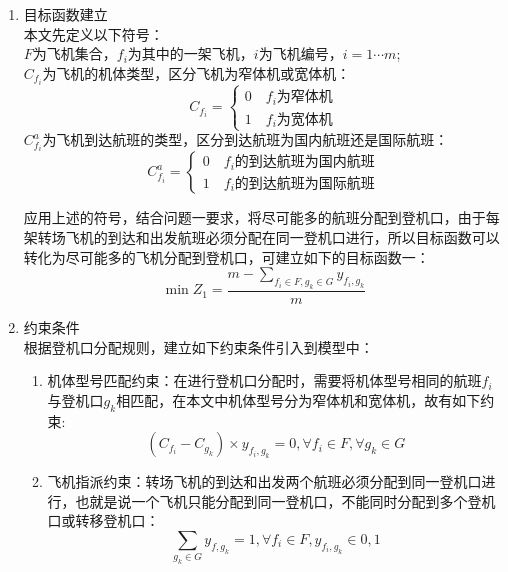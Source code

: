\documentclass[bwprint]{gmcmthesis}
\numberwithin{figure}{section}
\begin{document}
\begin{enumerate}[label={(\arabic*)}]
\item 目标函数建立 \\
本文先定义以下符号：\\
$F$为飞机集合，$f_i$为其中的一架飞机，$i$为飞机编号，$i=1 \cdots m$; \\
$C_{f_i}$为飞机的机体类型，区分飞机为窄体机或宽体机：
\begin{equation}
C_{f_i}=\begin{cases}
0 \quad f_i \text{为窄体机} \\
1 \quad f_i \text{为宽体机} 
\end{cases}
\end{equation}
$C_{f_i}^a$为飞机到达航班的类型，区分到达航班为国内航班还是国际航班：
\begin{equation}
C_{f_i}^a=\begin{cases}
0 \quad f_i \text{的到达航班为国内航班} \\
1 \quad f_i \text{的到达航班为国际航班} 
\end{cases}
\end{equation}

应用上述的符号，结合问题一要求，将尽可能多的航班分配到登机口，由于每架转场飞机的到达和出发航班必须分配在同一登机口进行，所以目标函数可以转化为尽可能多的飞机分配到登机口，可建立如下的目标函数一：
\begin{equation}
\min Z_1=\frac{m-\sum\limits_{f_i\in F,g_k \in G} y_{f_i,g_k}}{m}
\end{equation}

\item 约束条件 \\
根据登机口分配规则，建立如下约束条件引入到模型中：
\begin{enumerate}
\item 机体型号匹配约束：在进行登机口分配时，需要将机体型号相同的航班$f_i$与登机口$g_k$相匹配，在本文中机体型号分为窄体机和宽体机，故有如下约束:
\begin{equation}
(C_{f_i}-C_{g_k}) \times y_{f_i,g_k}=0, \forall f_i \in F, \forall g_k \in G
\end{equation}
\item 飞机指派约束：转场飞机的到达和出发两个航班必须分配到同一登机口进行，也就是说一个飞机只能分配到同一登机口，不能同时分配到多个登机口或转移登机口：
\begin{equation}
\sum_{g_k \in G} y_{f,g_k}=1, \forall f_i \in F, y_{f_i,g_k} \in {0,1}
\end{equation}
\end{enumerate}

\end{enumerate}
\end{document}
